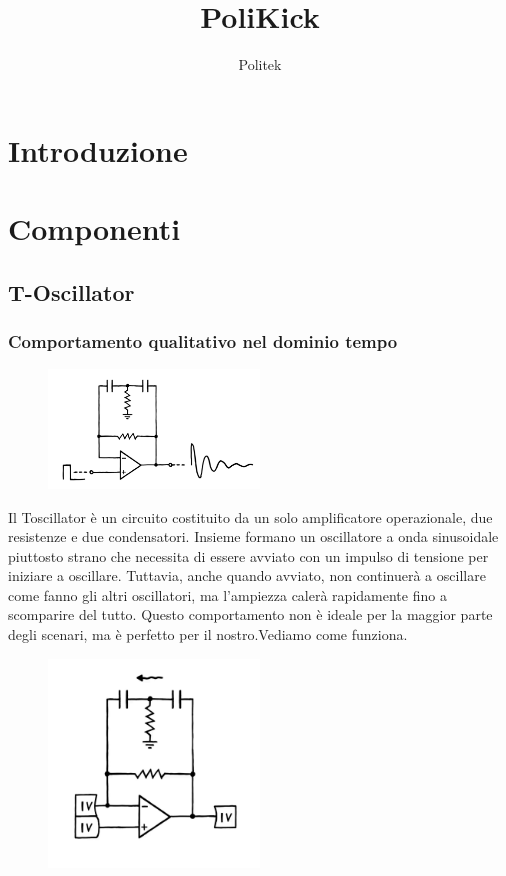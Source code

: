 \documentclass{article}
\title{PoliKick}
\author{Politek}
\begin{document}
\maketitle


\section{Introduzione}


\section{Componenti}
\subsection{T-Oscillator}

\subsubsection{Comportamento qualitativo nel dominio tempo}
\begin{figure}[h]
    \centering
    \includegraphics[width=0.5\textwidth]{Toscillator.png} 
    \label{fig:Toscillator}
\end{figure}

Il Toscillator è un  circuito costituito da un solo amplificatore operazionale, due resistenze e due condensatori. Insieme formano un oscillatore a onda sinusoidale piuttosto strano che necessita di essere avviato con un impulso di tensione per iniziare a oscillare. Tuttavia, anche quando avviato, non continuerà a oscillare come fanno gli altri oscillatori, ma l'ampiezza calerà rapidamente fino a scomparire del tutto. Questo comportamento non è ideale per la maggior parte degli scenari, ma è perfetto per il nostro.Vediamo come funziona.

\begin{figure}[h]
    \centering
    \includegraphics[width=0.5\textwidth]{Toscillator1.png} 
    \label{fig:Toscillator1}
\end{figure}
\end{document}
